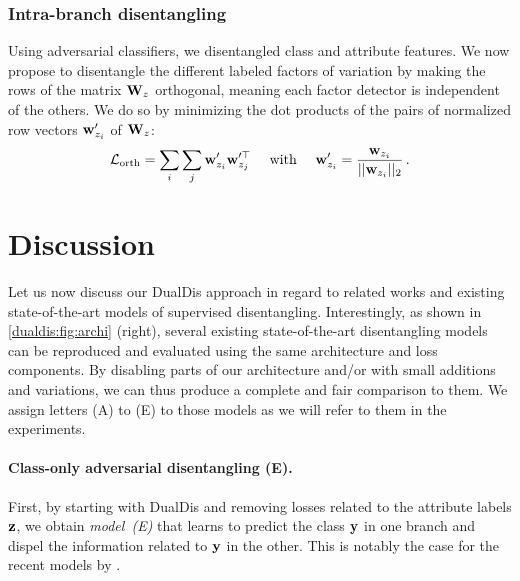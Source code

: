 \subsubsection{Intra-branch disentangling}

Using adversarial classifiers, we disentangled class and attribute features. We now propose to disentangle the different labeled factors of variation by making the rows of the matrix $\mathbf{W}_z$ orthogonal, meaning each factor detector is independent of the others. We do so by minimizing the dot products of the pairs of normalized row vectors $\mathbf{w}_{z_i}'$ of $\mathbf{W}_z$:
\begin{equation}
    \mathcal{L}_\mathrm{orth} = \sum_i \sum_j \mathbf{w}_{z_i}' \mathbf{w}_{z_j}'^{\top} \quad\text{ with }\quad \mathbf{w}_{z_i}' = \frac{\mathbf{w}_{z_i}}{||\mathbf{w}_{z_i}||_2} \,.
\end{equation}

\newcommand{\MTHNref}{(A\,\&\,B)\xspace}
\newcommand{\MTref}{(A)\xspace}
\newcommand{\MTANref}{(C)\xspace}
\newcommand{\HNref}{(B)\xspace}
\newcommand{\HNpref}{(B')\xspace}
\newcommand{\HNrefs}{(B\,\&\,B')\xspace}
\newcommand{\UAIref}{(D)\xspace}
\newcommand{\UAIrefs}{(D\,\&\,D')\xspace}
\newcommand{\UAIpref}{(D')\xspace}
\newcommand{\Yref}{(E)\xspace}

\section{Discussion}
\label{dualdis:sec:discussion}

Let us now discuss our DualDis approach in regard to related works and existing state-of-the-art models of supervised disentangling. 
Interestingly, as shown in \autoref{dualdis:fig:archi} (right), several existing state-of-the-art disentangling models can be reproduced and evaluated using the same architecture and loss components. By disabling parts of our architecture and/or with small additions and variations, we can thus produce a complete and fair comparison to them. We assign letters (A) to (E) to those models as we will refer to them in the experiments.

\paragraph{Class-only adversarial disentangling \Yref.}

First, by starting with Dual\-Dis and removing losses related to the attribute labels $\mathbf{z}$, we obtain \textit{model~\Yref} that learns to predict the class $\mathbf{y}$ in one branch and dispel the information related to $\mathbf{y}$ in the other. This is notably the case for the recent models by \citet{Hadad2018,Liu2018a,Klys2018}.

